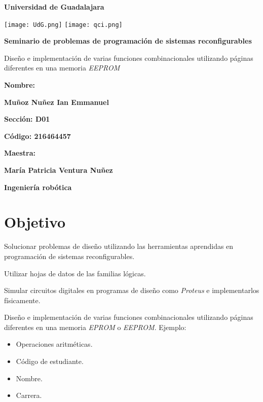 \documentclass[12pt, oneside, openany]{article}
\begin{document}
\begin{titlepage}
    \centering
    {\bfseries\LARGE Universidad de Guadalajara \par}
    \vfill
    {
        \texttt{[image: UdG.png]}
        \texttt{[image: qci.png]}
        \par
    }
    \vfill
    {\bfseries\LARGE Seminario de problemas de programación de sistemas reconfigurables \par}
    \vfill
    {\LARGE Diseño e implementación de varias funciones combinacionales utilizando páginas diferentes en una memoria \emph{EEPROM} \par}
    \vfill
    {\bfseries\LARGE Nombre: \par}
    \vfill
    {\bfseries\LARGE Muñoz Nuñez Ian Emmanuel \par}
    \vfill
    {\bfseries\LARGE Sección: D01 \par}
    \vfill
    {\bfseries\LARGE Código: 216464457 \par}
    \vfill
    {\bfseries\LARGE Maestra: \par}
    \vfill
    {\bfseries\LARGE María Patricia Ventura Nuñez \par}
    \vfill
    {\bfseries\LARGE Ingeniería robótica \par}
\end{titlepage}

\newpage

\section{Objetivo}
{\sffamily\large
    \hspace{0.5cm} Solucionar problemas de diseño utilizando las herramientas aprendidas en programación de sistemas reconfigurables.
    
    \hspace{0.5cm} Utilizar hojas de datos de las familias lógicas.
    
    \hspace{0.5cm} Simular circuitos digitales en programas de diseño como \emph{Proteus\texttrademark} e implementarlos físicamente.
    
    \hspace{0.5cm} Diseño e implementación de varias funciones combinacionales utilizando páginas diferentes en una memoria \emph{EPROM} o \emph{EEPROM}. Ejemplo:
    
    \renewcommand{\labelitemi}{$\bullet$}
    \begin{itemize}
        \item Operaciones aritméticas.
        \item Código de estudiante.
        \item Nombre.
        \item Carrera.
    \end{itemize}
    
}
\end{document}
